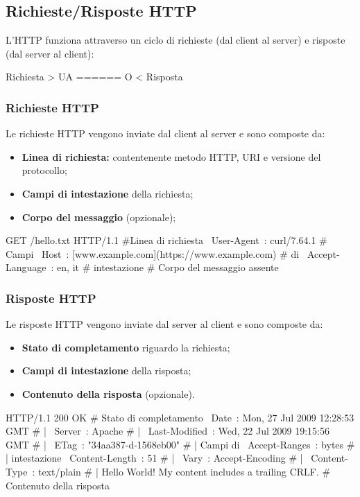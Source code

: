 \documentclass[12pt]{article}
\begin{document}
\subsection{Richieste/Risposte HTTP}
L'HTTP funziona attraverso un ciclo di richieste (dal client al server) e risposte (dal server al client):
\begin{code}
  Richiesta
  >
  UA ====== O
  <
  Risposta
\end{code}

\subsubsection{Richieste HTTP}
Le richieste HTTP vengono inviate dal client al server e sono composte da:
\begin{itemize}
\item \textbf{Linea di richiesta:} contentenente metodo HTTP, URI e versione del protocollo;
\item \textbf{Campi di intestazione} della richiesta;
\item \textbf{Corpo del messaggio} (opzionale);
\end{itemize}
\begin{code}[language=HTTP]
  GET /hello.txt HTTP/1.1 #Linea di richiesta
  ~User-Agent~: curl/7.64.1                           # Campi
  ~Host~: [www.example.com](https://www.example.com)  # di
  ~Accept-Language~: en, it                           # intestazione
  # Corpo del messaggio assente
\end{code}

\begin{samepage}
\subsubsection{Risposte HTTP}
Le risposte HTTP vengono inviate dal server al client e sono composte da:
\begin{itemize}
  \item \textbf{Stato di completamento} riguardo la richiesta;
  \item \textbf{Campi di intestazione} della risposta;
  \item \textbf{Contenuto della risposta} (opzionale).
\end{itemize}
\begin{code}[language=HTTP]
  HTTP/1.1 200 OK # Stato di completamento
  ~Date~: Mon, 27 Jul 2009 12:28:53 GMT          # |
  ~Server~: Apache                               # |
  ~Last-Modified~: Wed, 22 Jul 2009 19:15:56 GMT # |
  ~ETag~: "34aa387-d-1568eb00"                   # | Campi di
  ~Accept-Ranges~: bytes                         # | intestazione
  ~Content-Length~: 51                           # |
  ~Vary~: Accept-Encoding                        # |
  ~Content-Type~: text/plain                     # |
  Hello World! My content includes a trailing CRLF. # Contenuto della risposta
\end{code}
\end{samepage}
\end{document}
